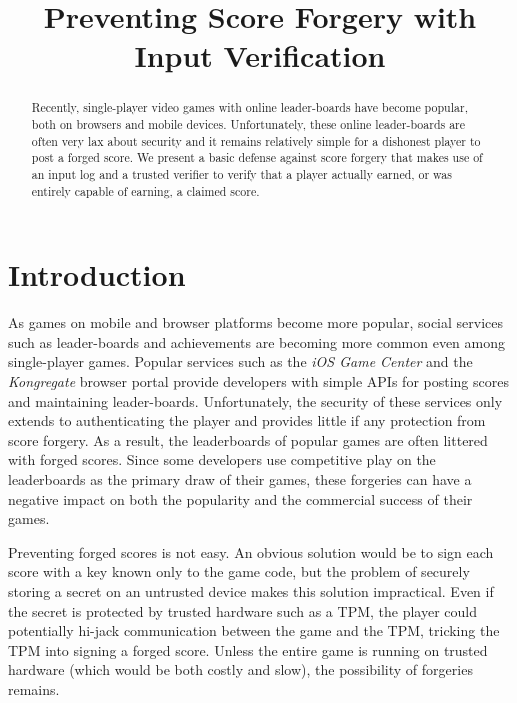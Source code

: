 \documentclass [11pt, twocolumn] {article}
\begin{document}
 

\title { Preventing Score Forgery with Input Verification } 
\date {}

\maketitle 

\begin{abstract}
Recently, single-player video games with online leader-boards have become popular, both on browsers and mobile devices. Unfortunately, these online leader-boards are often very lax about security and it remains relatively simple for a dishonest player to post a forged score. We present a basic defense against score forgery that makes use of an input log and a trusted verifier to verify that a player actually earned, or was entirely capable of earning, a claimed score. 
\end{abstract}

\section { Introduction }

As games on mobile and browser platforms become more popular, social services such as leader-boards and achievements are becoming more common even among single-player games. Popular services such as the \emph {iOS Game Center} and the \emph {Kongregate} browser portal provide developers with simple APIs for posting scores and maintaining leader-boards. Unfortunately, the security of these services only extends to authenticating the player and provides little if any protection from score forgery. As a result, the leaderboards of popular games are often littered with forged scores. Since some developers use competitive play on the leaderboards as the primary draw of their games, these forgeries can have a negative impact on both the popularity and the commercial success of their games.

Preventing forged scores is not easy. An obvious solution would be to sign each score with a key known only to the game code, but the problem of  securely storing a secret on an untrusted device makes this solution impractical. Even if the secret is protected by trusted hardware such as a TPM, the player could potentially hi-jack communication between the game and the TPM, tricking the TPM into signing a forged score. Unless the entire game is running on trusted hardware (which would be both costly and slow), the possibility of forgeries remains.
\end{document}
